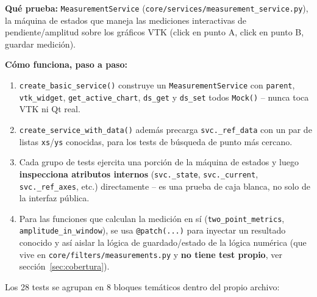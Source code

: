 \documentclass[11pt,a4paper]{article}
\begin{document}
\textbf{Qué prueba:} \texttt{MeasurementService} (\texttt{core/services/measurement\_\allowbreak service.py}), la
máquina de estados que maneja las mediciones interactivas de pendiente/amplitud sobre los gráficos VTK
(click en punto A, click en punto B, guardar medición).

\textbf{Cómo funciona, paso a paso:}
\begin{enumerate}
  \item \texttt{create\_\allowbreak basic\_\allowbreak service()} construye un \texttt{MeasurementService} con \texttt{parent},
        \texttt{vtk\_\allowbreak widget}, \texttt{get\_\allowbreak active\_\allowbreak chart}, \texttt{ds\_\allowbreak get} y \texttt{ds\_\allowbreak set} todos
        \texttt{Mock()} -- nunca toca VTK ni Qt real.
  \item \texttt{create\_\allowbreak service\_\allowbreak with\_\allowbreak data()} además precarga \texttt{svc.\_\allowbreak ref\_\allowbreak data} con un par de listas
        \texttt{xs}/\texttt{ys} conocidas, para los tests de búsqueda de punto más cercano.
  \item Cada grupo de tests ejercita una porción de la máquina de estados y luego \textbf{inspecciona
        atributos internos} (\texttt{svc.\_\allowbreak state}, \texttt{svc.\_\allowbreak current}, \texttt{svc.\_\allowbreak ref\_\allowbreak axes}, etc.)
        directamente -- es una prueba de caja blanca, no solo de la interfaz pública.
  \item Para las funciones que calculan la medición en sí (\texttt{two\_\allowbreak point\_\allowbreak metrics},
        \texttt{amplitude\_\allowbreak in\_\allowbreak window}), se usa \texttt{@patch(...)} para inyectar un resultado conocido y
        así aislar la lógica de guardado/estado de la lógica numérica (que vive en
        \texttt{core/filters/measurements.py} y \textbf{no tiene test propio}, ver
        sección~\ref{sec:cobertura}).
\end{enumerate}

Los 28 tests se agrupan en 8 bloques temáticos dentro del propio archivo:
\end{document}
